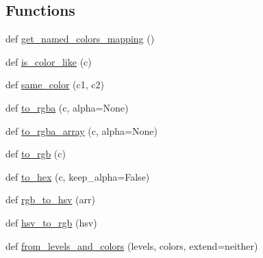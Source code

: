 \subsection*{Functions}
\begin{DoxyCompactItemize}
\item 
def \hyperlink{namespacematplotlib_1_1colors_ac1f82f4edf38753f7c7d9239c3698137}{get\+\_\+named\+\_\+colors\+\_\+mapping} ()
\item 
def \hyperlink{namespacematplotlib_1_1colors_a084095e38ce77a939da7c30a11a7c8d6}{is\+\_\+color\+\_\+like} (c)
\item 
def \hyperlink{namespacematplotlib_1_1colors_a61a26a45c36f62237abf3b79dd36befb}{same\+\_\+color} (c1, c2)
\item 
def \hyperlink{namespacematplotlib_1_1colors_ab7a6e21b0eb393bbeedfd1460836a31f}{to\+\_\+rgba} (c, alpha=None)
\item 
def \hyperlink{namespacematplotlib_1_1colors_a0bba722bf0433deacb90ea8dc18bbc8d}{to\+\_\+rgba\+\_\+array} (c, alpha=None)
\item 
def \hyperlink{namespacematplotlib_1_1colors_a131bb01614d6474f3031c00026bd93ec}{to\+\_\+rgb} (c)
\item 
def \hyperlink{namespacematplotlib_1_1colors_a7ddf4279539e8252678d727599925336}{to\+\_\+hex} (c, keep\+\_\+alpha=False)
\item 
def \hyperlink{namespacematplotlib_1_1colors_a2a8467e4e5d3ac2adce68fe3b9418d2c}{rgb\+\_\+to\+\_\+hsv} (arr)
\item 
def \hyperlink{namespacematplotlib_1_1colors_aa1382dea0b1d8f49082ccbdec1b800ce}{hsv\+\_\+to\+\_\+rgb} (hsv)
\item 
def \hyperlink{namespacematplotlib_1_1colors_a0fcfaa1c0452b2bc12641841d54dedf4}{from\+\_\+levels\+\_\+and\+\_\+colors} (levels, colors, extend=\textquotesingle{}neither\textquotesingle{})
\end{DoxyCompactItemize}
